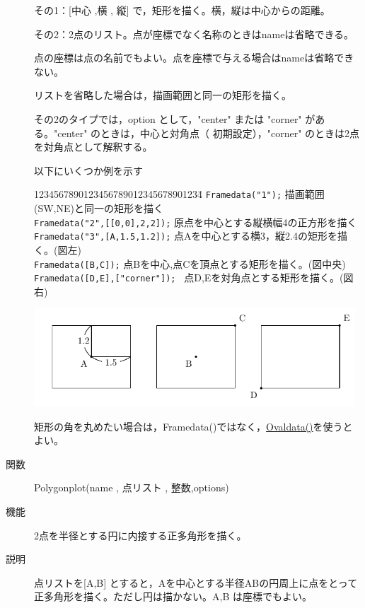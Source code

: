 \documentclass[papersize,a4paper,12pt,uplatex]{jsarticle}
\begin{document}
\begin{description}
その1：[中心 ,横 , 縦] で，矩形を描く。横，縦は中心からの距離。

その2：2点のリスト。点が座標でなく名称のときはnameは省略できる。

点の座標は点の名前でもよい。点を座標で与える場合はnameは省略できない。

リストを省略した場合は，描画範囲と同一の矩形を描く。

その2のタイプでは，option として，"center" または "corner" がある。"center" のときは，中心と対角点（ 初期設定），"corner" のときは2点を対角点として解釈する。 

以下にいくつか例を示す
\begin{tabbing}
1234567890123456789012345678901234\=\kill
  \verb|Framedata("1");|  \> 描画範囲(SW,NE)と同一の矩形を描く\\
  \verb|Framedata("2",[[0,0],2,2]);|   \> 原点を中心とする縦横幅4の正方形を描く\\
  \verb|Framedata("3",[A,1.5,1.2]);|  \> 点Aを中心とする横3，縦2.4の矩形を描く。(図左)\\
  \verb|Framedata([B,C]);|                  \> 点Bを中心,点Cを頂点とする矩形を描く。(図中央)\\
  \verb|Framedata([D,E],["corner"]); |        \>  点D,Eを対角点とする矩形を描く。(図右)
 \end{tabbing}
\begin{center}\includegraphics[bb=0.00 0.00 348.15 106.16,width=12cm]{Fig/Framedata.pdf}\end{center}

矩形の角を丸めたい場合は，Framedata()ではなく，\hyperlink{ovaldata}{Ovaldata()}を使うとよい。
 
\vspace{\baselineskip}
\hypertarget{polygonplot}{}
\item[関数]  Polygonplot(name , 点リスト , 整数,options)
\item[機能]  2点を半径とする円に内接する正多角形を描く。
\item[説明]  点リストを[A,B] とすると，Aを中心とする半径ABの円周上に点をとって正多角形を描く。ただし円は描かない。A,B は座標でもよい。


\end{description}
\end{document}
